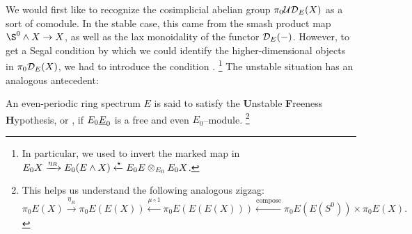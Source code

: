We would first like to recognize the cosimplicial abelian group \(\pi_0 \mathcal{UD}_E(X)\) as a sort of comodule.
In the stable case, this came from the smash product map \(\S^0 \sm X \to X\), as well as the lax monoidality of the functor \(\mathcal{D}_E(-)\).
However, to get a Segal condition by which we could identify the higher-dimensional objects in \(\pi_0 \mathcal{D}_E(X)\), we had to introduce the condition .%
\footnote{%
In particular, we used {\FH} to invert the marked map in \(E_0 X \xrightarrow{\eta_R} E_0(E \wedge X) \xleftarrow{\star} E_0 E \otimes_{E_0} E_0 X\).
}
The unstable situation has an analogous antecedent:

\begin{definition}
An even-periodic ring spectrum \(E\) is said to satisfy the \textbf{U}nstable \textbf{F}reeness \textbf{H}ypothesis, or \UFH, if \(E_0 \OS{E}{0}\) is a free and even \(E_0\)--module.%
\footnote{%
This helps us understand the following analogous zigzag: \[\pi_0 E(X) \xrightarrow{\eta_R} \pi_0 E(E(X)) \xleftarrow{\mu \circ 1} \pi_0 E(E(E(X))) \xleftarrow{\mathrm{compose}} \pi_0 E(E(S^0)) \times \pi_0 E(X).\]
}
\end{definition}

